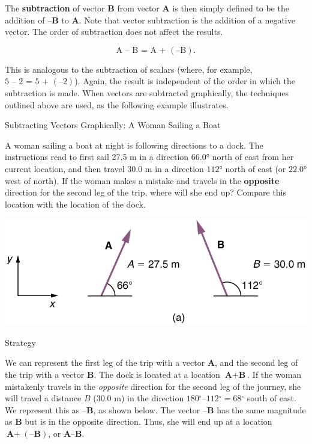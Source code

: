 \documentclass[
]{book}
\begin{document}
The \textbf{subtraction} of vector \(\textbf{B}{}\) from vector \(\textbf{A}{}\)
is then simply defined to be the addition of \(\textbf{–B}{}\) to
\(\textbf{A}{}\). Note that vector subtraction is the addition of a
negative vector. The order of subtraction does not affect the results.

\leavevmode{}%
\[{\text{A~–~B~=~A~+~}(\text{–B})}{}\text{.}\]

This is analogous to the subtraction of scalars (where, for example,
\({\text{5~–~2~=~5~+~}(\text{–2})}{}\)). Again, the result is independent
of the order in which the subtraction is made. When vectors are
subtracted graphically, the techniques outlined above are used, as the
following example illustrates.

\hypertarget{fs-id1165296679497}{}
Subtracting Vectors Graphically: A Woman Sailing a Boat

A woman sailing a boat at night is following directions to a dock. The
instructions read to first sail 27.5 m in a direction \(\text{66.0°}{}\)
north of east from her current location, and then travel 30.0 m in a
direction \(\text{112°}\) north of east (or \(\text{22.0°}{}\) west of
north). If the woman makes a mistake and travels in the \textbf{opposite}
direction for the second leg of the trip, where will she end up? Compare
this location with the location of the dock.

\includegraphics{images/Figure_03_02_14.jpg}

{Strategy}

We can represent the first leg of the trip with a vector \(\textbf{A}\),
and the second leg of the trip with a vector \(\textbf{B}{}\). The dock is
located at a location \({\textbf{A} + \textbf{B}}{}\). If the woman
mistakenly travels in the \emph{opposite} direction for the second leg of the
journey, she will travel a distance \(B\) (30.0 m) in the direction
\({180{^\circ}–112{^\circ} = 68{^\circ}}{}\) south of east. We represent
this as \(\textbf{–B}{}\), as shown below. The vector \(\textbf{–B}\) has
the same magnitude as \(\textbf{B}\) but is in the opposite direction.
Thus, she will end up at a location \({\textbf{A} +}(\textbf{–B})\), or
\({\textbf{A}–\textbf{B}}{}\).
\end{document}
